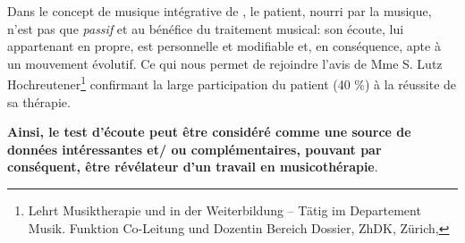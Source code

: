 \begin{itemize}
 
 
 
 
 
 

 
 
 Dans le concept de musique intégrative de \autocite[Cf.]
{vrait_musicotherapie_2018},  le patient, nourri par
la musique, n'est pas que \textit{passif }et
au bénéfice  du traitement musical: son écoute, lui
appartenant en propre, est personnelle et modifiable %
et, en conséquence, apte à un mouvement évolutif.
Ce qui nous permet de rejoindre l'avis de Mme S. Lutz
Hochreutener\footnote{Lehrt Musiktherapie und in der Weiterbildung – Tätig
	im Departement Musik. Funktion Co-Leitung und Dozentin Bereich
	Dossier, ZhDK, Zürich, %
}
confirmant la large participation du patient (40 \%) à la réussite de sa thérapie.


  
  \end{itemize}

  \textbf{Ainsi, le test
  d'écoute peut être considéré comme une source de données
   intéressantes et/ ou complémentaires, pouvant par conséquent, être
  \textbf{révélateur d'un
  travail en musicothérapie}}.



